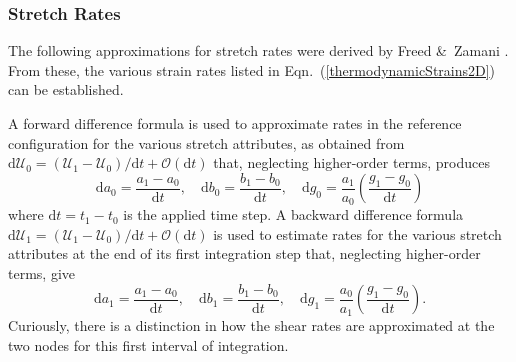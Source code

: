 \subsubsection{Stretch Rates}

The following approximations for stretch rates were derived by Freed \&\ Zamani \cite{FreedZamani18}.  From these, the various strain rates listed in Eqn.~(\ref{thermodynamicStrains2D}) can be established.  

A forward difference formula is used to approximate rates in the reference configuration for the various stretch attributes, as obtained from $\mathrm{d}\boldsymbol{\mathcal{U}}_0 = ( \boldsymbol{\mathcal{U}}_1 -  \boldsymbol{\mathcal{U}}_0 ) / \mathrm{d}t + \mathcal{O}(\mathrm{d}t)$ that, neglecting higher-order terms, produces
\begin{equation}
\mathrm{d} a_0 = \frac {a_1 - a_0}{\mathrm{d}t} , \quad 
\mathrm{d} b_0 = \frac {b_1 - b_0}{\mathrm{d}t} , \quad 
\mathrm{d} g_0 = \frac{a_1}{a_0} 
\left( \frac{g_1 - g_0}{\mathrm{d}t} \right) 
\label{forwardDifference1stOrder2D}
\end{equation}
where $\mathrm{d} t = t_1 - t_0$ is the applied time step.  A backward difference formula $\mathrm{d} \boldsymbol{\mathcal{U}}_1 = ( \boldsymbol{\mathcal{U}}_1 - \boldsymbol{\mathcal{U}}_0 ) / \mathrm{d}t + \mathcal{O}(\mathrm{d}t)$ is used to estimate rates for the various stretch attributes at the end of its first integration step that, neglecting higher-order terms, give
\begin{equation}
\mathrm{d} a_1 = \frac {a_1 - a_0}{\mathrm{d}t} , \quad
\mathrm{d} b_1 = \frac {b_1 - b_0}{\mathrm{d}t} , \quad
\mathrm{d} g_1 = \frac{a_0}{a_1} 
\left(\frac{g_1 - g_0}{\mathrm{d}t} \right) .
\label{backwardDifference1stOrder2D}
\end{equation}
Curiously, there is a distinction in how the shear rates are approximated at the two nodes for this first interval of integration.


